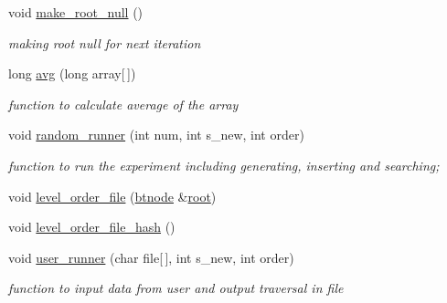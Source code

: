 \begin{DoxyCompactItemize}
void \hyperlink{class_btreehash_1_1utility_a64dcb2425033c0b70065fc11fe508d6d}{make\-\_\-root\-\_\-null} ()
\begin{DoxyCompactList}\small\item\em making root null for next iteration \end{DoxyCompactList}\item 
long \hyperlink{class_btreehash_1_1utility_ad4a3bda930b1f1e28cdd039cc2b6cd98}{avg} (long array\mbox{[}$\,$\mbox{]})
\begin{DoxyCompactList}\small\item\em function to calculate average of the array \end{DoxyCompactList}\item 
void \hyperlink{class_btreehash_1_1utility_abada7022304f62e821c604457a6f2d2e}{random\-\_\-runner} (int num, int s\-\_\-new, int order)
\begin{DoxyCompactList}\small\item\em function to run the experiment including generating, inserting and searching; \end{DoxyCompactList}\item 
void \hyperlink{class_btreehash_1_1utility_a536a94662cfb616df63fe9019c3a400d}{level\-\_\-order\-\_\-file} (\hyperlink{namespace_btreehash_ac7db8bb3c794c446de540bf6a03955bc}{btnode} \&\hyperlink{class_btreehash_1_1utility_ab36d736ef77e71394c00e2fa90865a69}{root})
\item 
void \hyperlink{class_btreehash_1_1utility_a0ba7dbd40de0dc7db6fff65f198066c5}{level\-\_\-order\-\_\-file\-\_\-hash} ()
\item 
void \hyperlink{class_btreehash_1_1utility_aaa36b0a18cea66805c8a19074eb628e2}{user\-\_\-runner} (char file\mbox{[}$\,$\mbox{]}, int s\-\_\-new, int order)
\begin{DoxyCompactList}\small\item\em function to input data from user and output traversal in file \end{DoxyCompactList}\end{DoxyCompactItemize}
